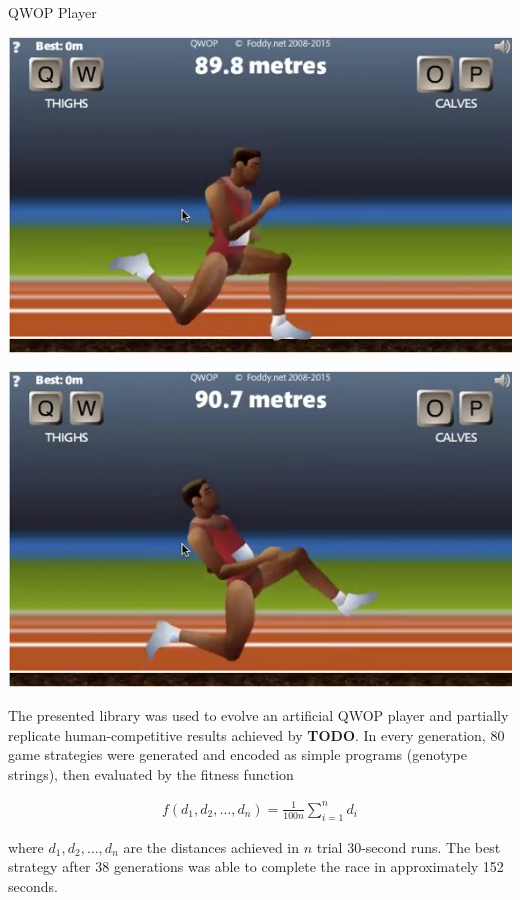 \documentclass[a0paper,portrait]{baposter}
\newcommand*{\todo}{\textbf{TODO}}
\begin{document}
\begin{poster}
\begin{posterbox}[name=qwop,column=2]{QWOP Player}
\parbox[c]{0.49\linewidth}{\includegraphics[width=\linewidth]{runner1}}
\hfill
\parbox[c]{0.49\linewidth}{\includegraphics[width=\linewidth]{runner2}}

\vspace{0.5em}

The presented library was used to evolve an artificial QWOP player and partially replicate human-competitive results achieved by \todo. In every generation, 80 game strategies were generated and encoded as simple programs (genotype strings), then evaluated by the fitness function

\vspace{-1.7em}

\begin{align*}
	f(d_1,d_2,\dots,d_n) = \frac{1}{100n} \sum_{i=1}^n d_i
\end{align*}

\vspace{-0.5em}

where $d_1,d_2,\dots,d_n$ are the distances achieved in $n$ trial 30-second runs. The best strategy after 38 generations was able to complete the race in approximately 152 seconds.


\end{posterbox}
\end{poster}
\end{document}
